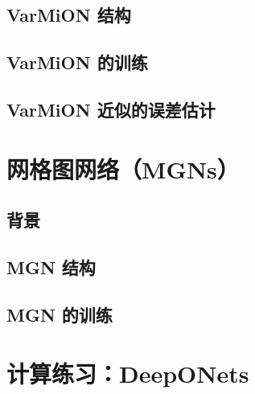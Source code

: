 \subsection{VarMiON 结构}
\subsection{VarMiON 的训练}
\subsection{VarMiON 近似的误差估计}

\section{网格图网络（MGNs）}
\subsection{背景}
\subsection{MGN 结构}
\subsection{MGN 的训练}

\section{计算练习：DeepONets}

\newpage
